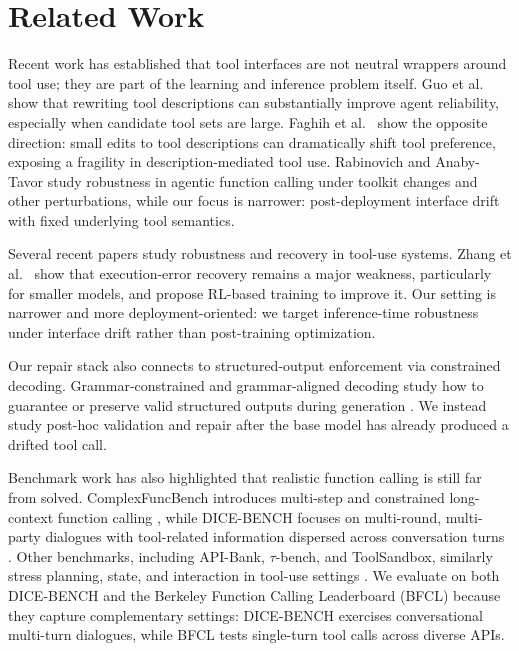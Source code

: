 \documentclass{svproc}
\begin{document}
\section{Related Work}
Recent work has established that tool interfaces are not neutral wrappers around
tool use; they are part of the learning and inference problem itself.
Guo et al.~\cite{guo2026rewrite} show that rewriting tool descriptions can
substantially improve agent reliability, especially when candidate tool sets are
large. Faghih et al.~\cite{faghih2025gaming} show the opposite direction:
small edits to tool descriptions can dramatically shift tool preference, exposing a
fragility in description-mediated tool use. Rabinovich and Anaby-Tavor
\cite{rabinovich2025robustness} study robustness in agentic function calling under
toolkit changes and other perturbations, while our focus is narrower: post-deployment
interface drift with fixed underlying tool semantics.

Several recent papers study robustness and recovery in tool-use systems.
Zhang et al.~\cite{zhang2026fission} show that execution-error recovery remains a
major weakness, particularly for smaller models, and propose RL-based training to
improve it. Our setting is narrower and more deployment-oriented: we target
inference-time robustness under interface drift rather than post-training
optimization.

Our repair stack also connects to structured-output enforcement via constrained
decoding. Grammar-constrained and grammar-aligned decoding study how to guarantee
or preserve valid structured outputs during generation
\cite{geng2023grammar,park2024grammar}. We instead study post-hoc validation and
repair after the base model has already produced a drifted tool call.

Benchmark work has also highlighted that realistic function calling is still far from
solved. ComplexFuncBench introduces multi-step and constrained long-context function
calling \cite{zhong2025complexfuncbench}, while DICE-BENCH focuses on multi-round,
multi-party dialogues with tool-related information dispersed across conversation
turns \cite{jang2025dicebench}. Other benchmarks, including API-Bank,
$\tau$-bench, and ToolSandbox, similarly stress planning, state, and interaction
in tool-use settings \cite{li2023apibank,yao2024taubench,lu2024toolsandbox}. We
evaluate on both DICE-BENCH and the Berkeley Function Calling Leaderboard (BFCL)
\cite{bfcl2024} because they capture complementary settings: DICE-BENCH exercises
conversational multi-turn dialogues, while BFCL tests single-turn tool calls across
diverse APIs.
\end{document}
